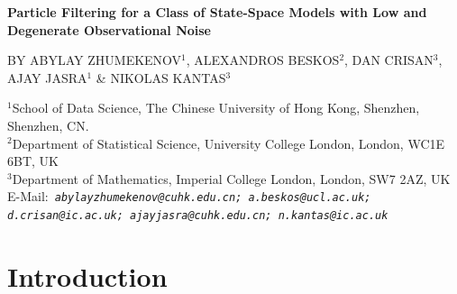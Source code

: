 \documentclass[english,13pt]{article}
\numberwithin{equation}{section}
\begin{document}
\begin{center}

{\Large \textbf{Particle Filtering for a Class of State-Space Models with Low and Degenerate Observational Noise}}

\vspace{0.5cm}

BY  ABYLAY ZHUMEKENOV$^{1}$,  ALEXANDROS BESKOS$^{2}$,  DAN CRISAN$^{3}$, AJAY JASRA$^{1}$ \& NIKOLAS KANTAS$^{3}$

{\footnotesize $^{1}$School of Data Science,  The Chinese University of Hong Kong,  Shenzhen,  Shenzhen, CN.}\\
{\footnotesize $^{2}$Department of Statistical Science, University College London, London, WC1E 6BT, UK}\\
{\footnotesize $^{3}$Department of Mathematics, Imperial College London, London, SW7 2AZ, UK}\\
{\footnotesize E-Mail:\,} \texttt{\emph{\footnotesize  abylayzhumekenov@cuhk.edu.cn; 
a.beskos@ucl.ac.uk; d.crisan@ic.ac.uk;  
ajayjasra@cuhk.edu.cn; n.kantas@ic.ac.uk
}}

\end{center}



\begin{abstract}
We consider the discrete-time filtering problem in scenarios where the observation noise is  low or degenerate.
We focus on the case where the observation equation is a linear function of the state and the data   involve additive noise.  However,  we place minimal assumptions on the hidden state process.  For such a class of models  we derive new particle filters (PFs) with the key property that their performance is robust to the size of the observation noise. As a consequence,  the developed PFs are well-defined in the limiting case of degenerate observation noise.  Indicatively,  we prove (under assumptions) that the PF applied  in this low noise setting inherits the properties of the PF used in the degenerate case.
  We extend our framework to the case where the hidden states are drawn from a diffusion process.  In this scenario we develop new PFs which are robust to both low noise and fine levels of time discretization.  We illustrate our algorithms numerically on several examples.
\\
\textbf{Keywords}:  Particle filters,  low \& degenerate noise,  diffusions,  time discretization.
\end{abstract}

\section{Introduction}
\end{document}
